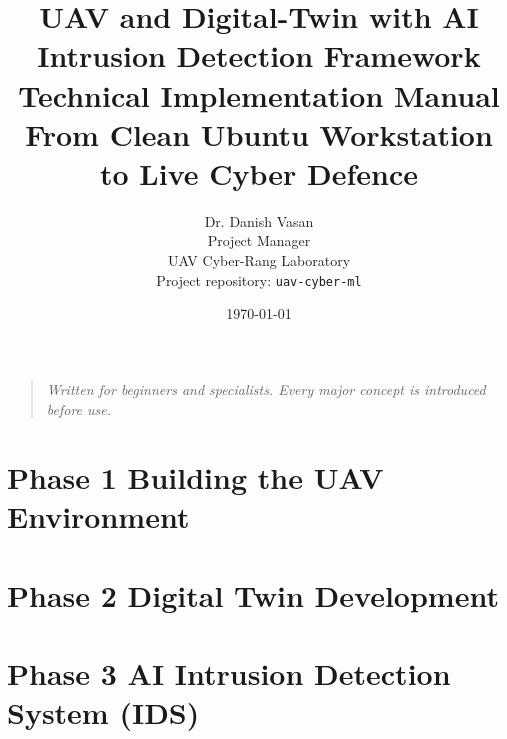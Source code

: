 \documentclass[11pt,a4paper,oneside]{book}
\title{%
  UAV and Digital-Twin with AI Intrusion Detection Framework\\
  \large Technical Implementation Manual\\
  \normalsize From Clean Ubuntu Workstation to Live Cyber Defence
}
\author{Dr. Danish Vasan\\
Project Manager \\ 
UAV Cyber-Rang Laboratory \\
  Project repository: \texttt{uav-cyber-ml}}
\date{\today}
\begin{document}
\frontmatter
\maketitle

\begin{quotation}
\noindent\textit{Written for beginners and specialists.
Every major concept is introduced before use.}
\end{quotation}

\tableofcontents
\listoffigures
\listoftables



\mainmatter

\part{Phase 1   Building the UAV Environment}












\part{Phase 2   Digital Twin Development}













\part{Phase 3   AI Intrusion Detection System (IDS)}















\backmatter


\appendix




\end{document}
